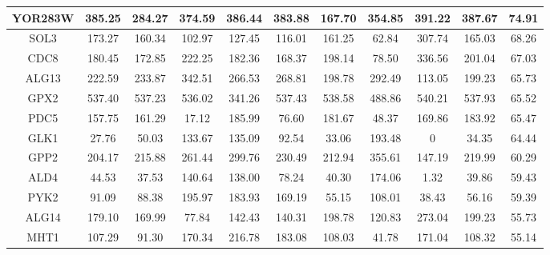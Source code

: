 \begin{table}[H]
\begin{center}
{\begin{tabular}{|c|c|c|c|c|c|c|c|c|c|c|}
YOR283W         & 385.25             & 284.27             & 374.59            & 386.44                     & 383.88        & 167.70          & 354.85                 & 391.22          & 387.67            & 74.91        \\ \hline
SOL3            & 173.27             & 160.34             & 102.97            & 127.45                     & 116.01        & 161.25          & 62.84                  & 307.74          & 165.03            & 68.26        \\ \hline
CDC8            & 180.45             & 172.85             & 222.25            & 182.36                     & 168.37        & 198.14          & 78.50                  & 336.56          & 201.04            & 67.03        \\ \hline
ALG13           & 222.59             & 233.87             & 342.51            & 266.53                     & 268.81        & 198.78          & 292.49                 & 113.05          & 199.23            & 65.73        \\ \hline
GPX2            & 537.40             & 537.23             & 536.02            & 341.26                     & 537.43        & 538.58          & 488.86                 & 540.21          & 537.93            & 65.52        \\ \hline
PDC5            & 157.75             & 161.29             & 17.12             & 185.99                     & 76.60         & 181.67          & 48.37                  & 169.86          & 183.92            & 65.47        \\ \hline
GLK1            & 27.76              & 50.03              & 133.67            & 135.09                     & 92.54         & 33.06           & 193.48                 & 0               & 34.35             & 64.44        \\ \hline
GPP2            & 204.17             & 215.88             & 261.44            & 299.76                     & 230.49        & 212.94          & 355.61                 & 147.19          & 219.99            & 60.29        \\ \hline
ALD4            & 44.53              & 37.53              & 140.64            & 138.00                     & 78.24         & 40.30           & 174.06                 & 1.32            & 39.86             & 59.43        \\ \hline
PYK2            & 91.09              & 88.38              & 195.97            & 183.93                     & 169.19        & 55.15           & 108.01                 & 38.43           & 56.16             & 59.39        \\ \hline
ALG14           & 179.10             & 169.99             & 77.84             & 142.43                     & 140.31        & 198.78          & 120.83                 & 273.04          & 199.23            & 55.73        \\ \hline
MHT1            & 107.29             & 91.30              & 170.34            & 216.78                     & 183.08        & 108.03          & 41.78                  & 171.04          & 108.32            & 55.14        \\ \hline


\end{tabular}}
\end{center}
\end{table}

